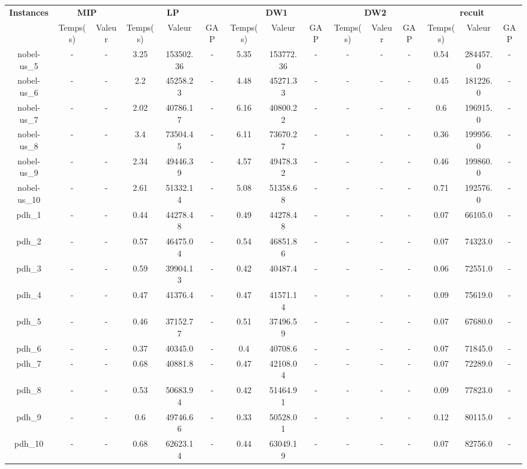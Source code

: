 \documentclass[main.tex]{subfiles}
\begin{document}
\newpage
\thispagestyle{empty}
\begin{landscape}
\begin{table}[h]
    \centering
    \begin{tabular}{c|cc|ccc|ccc|ccc|ccc}
	\hline	
	\textbf{Instances} &\multicolumn{2}{c}{\textbf{MIP}} &\multicolumn{3}{c}{\textbf{LP}} &\multicolumn{3}{c}{\textbf{DW1}} &\multicolumn{3}{c}{\textbf{DW2}} &\multicolumn{3}{c}{\textbf{recuit}}\\
	 &Temps(s) &Valeur &Temps(s) &Valeur &GAP &Temps(s) &Valeur &GAP &Temps(s) &Valeur &GAP &Temps(s) &Valeur &GAP\\

	\hline
	nobel-us\_5 &- &- &3.25 &153502.36 &- &5.35 &153772.36 &- &- &- &- &0.54 &284457.0 &-\\
	nobel-us\_6 &- &- &2.2 &45258.23 &- &4.48 &45271.33 &- &- &- &- &0.45 &181226.0 &-\\
	nobel-us\_7 &- &- &2.02 &40786.17 &- &6.16 &40800.22 &- &- &- &- &0.6 &196915.0 &-\\
	nobel-us\_8 &- &- &3.4 &73504.45 &- &6.11 &73670.27 &- &- &- &- &0.36 &199956.0 &-\\
	nobel-us\_9 &- &- &2.34 &49446.39 &- &4.57 &49478.32 &- &- &- &- &0.46 &199860.0 &-\\
	nobel-us\_10 &- &- &2.61 &51332.14 &- &5.08 &51358.68 &- &- &- &- &0.71 &192576.0 &-\\
	pdh\_1 &- &- &0.44 &44278.48 &- &0.49 &44278.48 &- &- &- &- &0.07 &66105.0 &-\\
	pdh\_2 &- &- &0.57 &46475.04 &- &0.54 &46851.86 &- &- &- &- &0.07 &74323.0 &-\\
	pdh\_3 &- &- &0.59 &39904.13 &- &0.42 &40487.4 &- &- &- &- &0.06 &72551.0 &-\\
	pdh\_4 &- &- &0.47 &41376.4 &- &0.47 &41571.14 &- &- &- &- &0.09 &75619.0 &-\\
	pdh\_5 &- &- &0.46 &37152.77 &- &0.51 &37496.59 &- &- &- &- &0.07 &67680.0 &-\\
	pdh\_6 &- &- &0.37 &40345.0 &- &0.4 &40708.6 &- &- &- &- &0.07 &71845.0 &-\\
	pdh\_7 &- &- &0.68 &40881.8 &- &0.47 &42108.04 &- &- &- &- &0.07 &72289.0 &-\\
	pdh\_8 &- &- &0.53 &50683.94 &- &0.42 &51464.91 &- &- &- &- &0.09 &77823.0 &-\\
	pdh\_9 &- &- &0.6 &49746.66 &- &0.33 &50528.01 &- &- &- &- &0.12 &80115.0 &-\\
	pdh\_10 &- &- &0.68 &62623.14 &- &0.44 &63049.19 &- &- &- &- &0.07 &82756.0 &-\\

\end{tabular}
\end{table}
\end{landscape}
\end{document}
